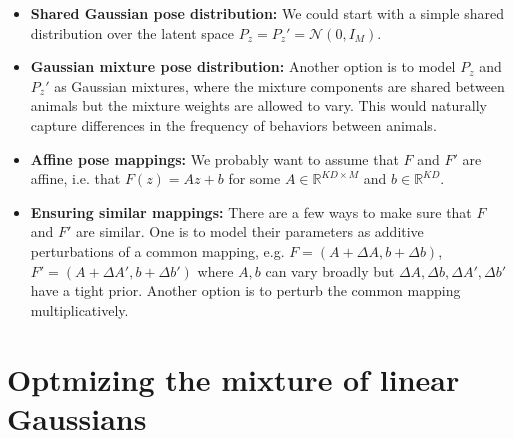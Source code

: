 \documentclass{article}         %
\begin{document}
\begin{itemize}
    \item \textbf{Shared Gaussian pose distribution:} We could start with a simple shared distribution over the latent space $P_z = P_z' = \mathcal{N}(0, I_M)$. 
    \item  \textbf{Gaussian mixture pose distribution:} Another option is to model $P_z$ and $P_z'$ as Gaussian mixtures, where the mixture components are shared between animals but the mixture weights are allowed to vary. This would naturally capture differences in the frequency of behaviors between animals.
    \item \textbf{Affine pose mappings:} We probably want to assume that $F$ and $F'$ are affine, i.e. that $F(z) = Az + b$ for some $A \in \mathbb{R}^{KD \times M}$ and $b \in \mathbb{R}^{KD}$. 
    \item \textbf{Ensuring similar mappings:} There are a few ways to make sure that $F$ and $F'$ are similar. One is to model their parameters as additive perturbations of a common mapping, e.g. $F = (A + \Delta A, b + \Delta b)$, $F' = (A + \Delta A', b + \Delta b')$ where $A,b$ can vary broadly but $\Delta A, \Delta b, \Delta A', \Delta b'$ have a tight prior. Another option is to perturb the common mapping multiplicatively. 

\end{itemize}

\section{Optmizing the mixture of linear Gaussians}
\end{document}
